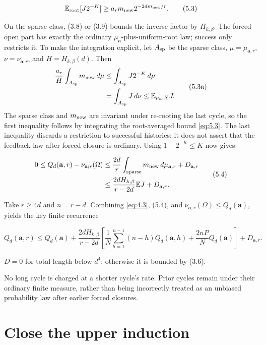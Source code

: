 \documentclass[11pt]{article}
\theoremstyle{remark}
\begin{document}
\[
 \mathbb E_{\rm root}[J2^{-K}]
 \ge a_rm_{\rm new}2^{-2dm_{\rm new}/r}.
 \tag{5.3}\label{eq:5.3}
\]

On the sparse class, (3.8) or (3.9) bounds the inverse factor by
\(H_{k,\beta}\). The forced open part has exactly the ordinary
\(\mu_{\mathbf a}\)-plus-uniform-root law; success only restricts it. To
make the integration explicit, let \(A_{\rm sp}\) be the sparse class,
\(\mu=\mu_{\mathbf a,r}\), \(\nu=\nu_{\mathbf a;r}\), and
\(H=H_{k,\beta}(d)\). Then \[
 \begin{aligned}
 \frac{a_r}{H}\int_{A_{\rm sp}}m_{\rm new}\,d\mu
 &\le \int_{A_{\rm sp}}J2^{-K}\,d\mu\\
 &=\int_{A_{\rm sp}}J\,d\nu
 \le \mathbb E_{\mu_{\mathbf a},X}J.
 \end{aligned}
 \tag{5.3a}\label{eq:5.3a}
\] The sparse class and \(m_{\rm new}\) are invariant under re-rooting
the last cycle, so the first inequality follows by integrating the
root-averaged bound \eqref{eq:5.3}. The last inequality discards a restriction to
successful histories; it does not assert that the feedback law after
forced closure is ordinary. Using \(1-2^{-K}\le K\) now gives

\[
\begin{split}
0\le Q_d(\mathbf a,r)-\nu_{\mathbf a;r}(\Omega)
&\le\frac{2d}{r}\int_{\rm sparse}m_{\rm new}\,d\mu_{\mathbf a,r}+D_{\mathbf a,r}\\
&\le\frac{2dH_{k,\beta}}{r-2d}\mathbb E J+D_{\mathbf a,r}.
\end{split}
\tag{5.4}\label{eq:5.4}
\]

Take \(r\ge4d\) and \(n=r-d\). Combining \eqref{eq:4.3}, (5.4), and
\(\nu_{\mathbf a;r}(\Omega)\le Q_d(\mathbf a)\), yields the key finite
recurrence

\[
\boxed{
Q_d(\mathbf a,r)\le Q_d(\mathbf a)
+\frac{2dH_{k,\beta}}{r-2d}
 \left[
 \frac1N\sum_{h=1}^{n-1}(n-h)Q_d(\mathbf a,h)
 +\frac{2nP}{N}Q_d(\mathbf a)
 \right]+D_{\mathbf a,r}.
}
\tag{5.5}\label{eq:5.5}
\]

\(D=0\) for total length below \(d^4\); otherwise it is bounded by
(3.6).

No long cycle is charged at a shorter cycle's rate. Prior cycles remain
under their ordinary finite measure, rather than being incorrectly
treated as an unbiased probability law after earlier forced closures.

\section{Close the upper induction}\label{close-the-upper-induction}
\end{document}
